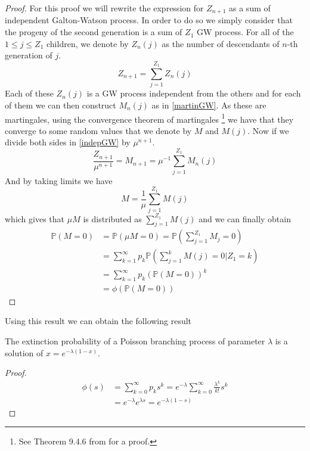 \begin{proof}
	For this proof we will rewrite the expression for $Z_{n+1}$ as a sum of independent Galton-Watson process. 
	In order to do so we simply consider that the progeny of the second generation is a sum of $Z_1$ GW process.
	For all of the $1 \leq j \leq Z_1$ children, we denote by $Z_n(j)$ as the number of descendants of $n$-th generation of $j$.
	\begin{equation}\label{indepGW}
		Z_{n+1} = \sum_{j=1}^{Z_1} Z_n(j)
	\end{equation}
	Each of these $Z_n(j)$ is a GW process independent from the others and for each of them we can then construct $M_n(j)$ as in \eqref{martinGW}.
	As these are martingales, using the convergence theorem of martingales
	\footnote{See Theorem 9.4.6 from \cite{chung00} for a proof.}
	we have that they converge to some random values that we denote by $M$ and $M(j)$.
	Now if we divide both sides in \eqref{indepGW} by $\mu^{n+1}$.
	\begin{equation}
		\frac{Z_{n+1}}{\mu^{n+1}} = M_{n+1} = \mu^{-1} \sum_{j=1}^{Z_1} M_n(j)
	\end{equation}
	And by taking limits we have
	\begin{equation}
		M = \frac{1}{\mu} \sum_{j=1}^{Z_1}M(j)
	\end{equation}
	which gives that $\mu M$ is distributed as $\sum_{j=1}^{Z_1}M(j)$ and we can finally obtain
	\begin{align}
		\mathbb{P}(M = 0) 	&= \mathbb{P}(\mu M = 0) = \mathbb{P}(\sum_{j=1}^{Z_1}M_j = 0) \\
					&= \sum_{k=1}^{\infty} p_k \mathbb{P}(\sum_{j=1}^{k} M(j) = 0 | Z_1 = k) \\
					&= \sum_{k=1}^{\infty} p_k (\mathbb{P}(M=0))^k\\
					&= \phi(\mathbb{P}(M=0))
	\end{align}
\end{proof}
Using this result we can obtain the following result
\begin{theorem}
	The extinction probability of a Poisson branching process of parameter $\lambda$ is a solution of $x = e^{-\lambda(1-x)}$.
\end{theorem}
\begin{proof}
	\begin{align}
		\phi(s) &= \sum_{k=0}^{\infty} p_k s^k = e^{-\lambda} \sum_{k=0}^{\infty} \frac{\lambda ^k}{k!} s^k\\
			&= e^{-\lambda}e^{\lambda s} = e^{-\lambda(1 -s)}
	\end{align}
\end{proof}

